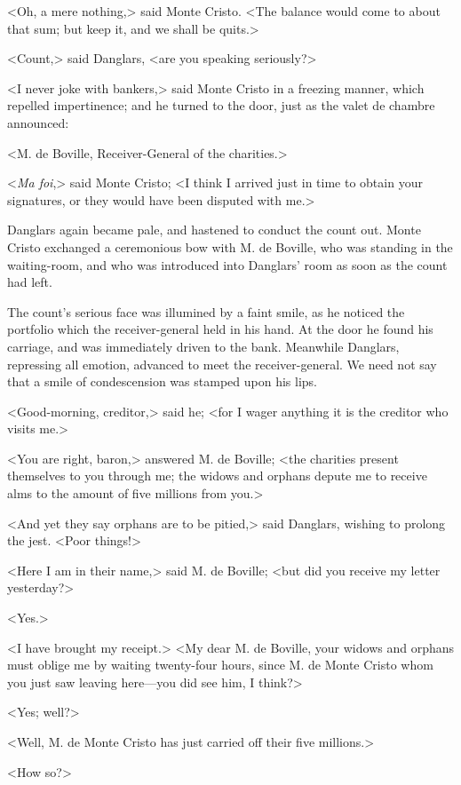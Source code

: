  <Oh, a mere nothing,> said Monte Cristo. <The balance would come to about that sum; but keep it, and we shall be quits.> 

 <Count,> said Danglars, <are you speaking seriously?> 

 <I never joke with bankers,> said Monte Cristo in a freezing manner, which repelled impertinence; and he turned to the door, just as the valet de chambre announced: 

 <M. de Boville, Receiver-General of the charities.> 

 <\textit{Ma foi},> said Monte Cristo; <I think I arrived just in time to obtain your signatures, or they would have been disputed with me.> 

 Danglars again became pale, and hastened to conduct the count out. Monte Cristo exchanged a ceremonious bow with M. de Boville, who was standing in the waiting-room, and who was introduced into Danglars' room as soon as the count had left. 

 The count's serious face was illumined by a faint smile, as he noticed the portfolio which the receiver-general held in his hand. At the door he found his carriage, and was immediately driven to the bank. Meanwhile Danglars, repressing all emotion, advanced to meet the receiver-general. We need not say that a smile of condescension was stamped upon his lips. 

 <Good-morning, creditor,> said he; <for I wager anything it is the creditor who visits me.> 

 <You are right, baron,> answered M. de Boville; <the charities present themselves to you through me; the widows and orphans depute me to receive alms to the amount of five millions from you.> 

 <And yet they say orphans are to be pitied,> said Danglars, wishing to prolong the jest. <Poor things!> 

 <Here I am in their name,> said M. de Boville; <but did you receive my letter yesterday?> 

 <Yes.> 

 <I have brought my receipt.>  <My dear M. de Boville, your widows and orphans must oblige me by waiting twenty-four hours, since M. de Monte Cristo whom you just saw leaving here—you did see him, I think?> 

 <Yes; well?> 

 <Well, M. de Monte Cristo has just carried off their five millions.> 

 <How so?> 

